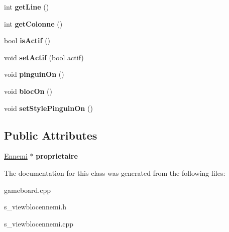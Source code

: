 \begin{DoxyCompactItemize}
\item 
\hypertarget{class_s___view_bloc_ennemi_af570c3ab5ad404591829ef8bbed13b08}{}int {\bfseries get\+Line} ()\label{class_s___view_bloc_ennemi_af570c3ab5ad404591829ef8bbed13b08}

\item 
\hypertarget{class_s___view_bloc_ennemi_ae843182fc545b9c84c22322873e499cd}{}int {\bfseries get\+Colonne} ()\label{class_s___view_bloc_ennemi_ae843182fc545b9c84c22322873e499cd}

\item 
\hypertarget{class_s___view_bloc_ennemi_a5aef2bd784ad1c7c180de4f5608a9624}{}bool {\bfseries is\+Actif} ()\label{class_s___view_bloc_ennemi_a5aef2bd784ad1c7c180de4f5608a9624}

\item 
\hypertarget{class_s___view_bloc_ennemi_a976bc517403eeef48f2e7d8bb67dfa99}{}void {\bfseries set\+Actif} (bool actif)\label{class_s___view_bloc_ennemi_a976bc517403eeef48f2e7d8bb67dfa99}

\item 
\hypertarget{class_s___view_bloc_ennemi_a3c6bb606eaf348d513caf0bfd73fd0aa}{}void {\bfseries pinguin\+On} ()\label{class_s___view_bloc_ennemi_a3c6bb606eaf348d513caf0bfd73fd0aa}

\item 
\hypertarget{class_s___view_bloc_ennemi_a930acab8e21620c59f18144230a9a33d}{}void {\bfseries bloc\+On} ()\label{class_s___view_bloc_ennemi_a930acab8e21620c59f18144230a9a33d}

\item 
\hypertarget{class_s___view_bloc_ennemi_a215944e297397346d3d5c0a08ae3d1fb}{}void {\bfseries set\+Style\+Pinguin\+On} ()\label{class_s___view_bloc_ennemi_a215944e297397346d3d5c0a08ae3d1fb}

\end{DoxyCompactItemize}
\subsection*{Public Attributes}
\begin{DoxyCompactItemize}
\item 
\hypertarget{class_s___view_bloc_ennemi_a81d0ab8a06869937e2c7bdc9674ab92e}{}\hyperlink{class_ennemi}{Ennemi} $\ast$ {\bfseries proprietaire}\label{class_s___view_bloc_ennemi_a81d0ab8a06869937e2c7bdc9674ab92e}

\end{DoxyCompactItemize}


The documentation for this class was generated from the following files\+:\begin{DoxyCompactItemize}
\item 
gameboard.\+cpp\item 
s\+\_\+viewblocennemi.\+h\item 
s\+\_\+viewblocennemi.\+cpp\end{DoxyCompactItemize}
